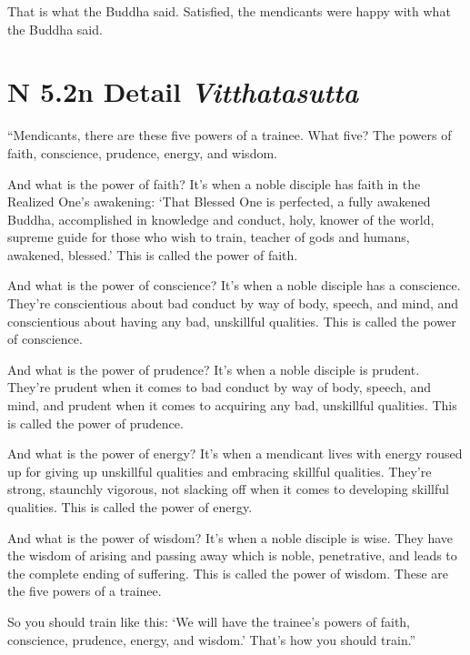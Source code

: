 \documentclass[12pt,openany]{book}%
\newcommand*{\suttatitleacronym}[1]{\smaller[2]{#1}\vspace*{.3em}}
\newcommand*{\suttatitletranslation}[1]{\linebreak{#1}}
\newcommand*{\suttatitleroot}[1]{\linebreak\smaller[2]\itshape{#1}}
\newcommand*{\tocacronym}[1]{\hspace*{-3.3em}{#1}\quad}
\newcommand*{\toctranslation}[1]{#1}
\newcommand*{\tocroot}[1]{(\textit{#1})}
\begin{document}
That is what the Buddha said. Satisfied, the mendicants were happy with what the Buddha said. 

%
\section*{{\suttatitleacronym AN 5.2}{\suttatitletranslation In Detail }{\suttatitleroot Vitthatasutta}}
\addcontentsline{toc}{section}{\tocacronym{AN 5.2} \toctranslation{In Detail } \tocroot{Vitthatasutta}}

“Mendicants, there are these five powers of a trainee. What five? The powers of faith, conscience, prudence, energy, and wisdom. 

And what is the power of faith? It’s when a noble disciple has faith in the Realized One’s awakening: ‘That Blessed One is perfected, a fully awakened Buddha, accomplished in knowledge and conduct, holy, knower of the world, supreme guide for those who wish to train, teacher of gods and humans, awakened, blessed.’ This is called the power of faith. 

And what is the power of conscience? It’s when a noble disciple has a conscience. They’re conscientious about bad conduct by way of body, speech, and mind, and conscientious about having any bad, unskillful qualities. This is called the power of conscience. 

And what is the power of prudence? It’s when a noble disciple is prudent. They’re prudent when it comes to bad conduct by way of body, speech, and mind, and prudent when it comes to acquiring any bad, unskillful qualities. This is called the power of prudence. 

And what is the power of energy? It’s when a mendicant lives with energy roused up for giving up unskillful qualities and embracing skillful qualities. They’re strong, staunchly vigorous, not slacking off when it comes to developing skillful qualities. This is called the power of energy. 

And what is the power of wisdom? It’s when a noble disciple is wise. They have the wisdom of arising and passing away which is noble, penetrative, and leads to the complete ending of suffering. This is called the power of wisdom. These are the five powers of a trainee. 

So you should train like this: ‘We will have the trainee’s powers of faith, conscience, prudence, energy, and wisdom.’ That’s how you should train.” 
\end{document}
